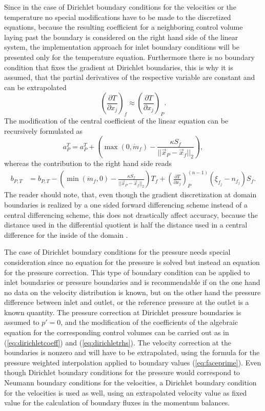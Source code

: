 Since in the case of Dirichlet boundary conditions for the velocities or the temperature no special modifications have to be made to the discretized equations, because the resulting coefficient for a neighboring control volume laying past the boundary is considered on the right hand side of the linear system, the implementation approach for inlet boundary conditions will be presented only for the temperature equation. Furthermore there is no boundary condition that fixes the gradient at Dirichlet boundaries, this is why it is assumed, that the partial derivatives of the respective variable are constant and can be extrapolated
\begin{displaymath}
  \left( \frac{\partial T}{\partial x_j} \right)_f \approx \left( \frac{\partial T}{\partial x_j} \right)_P.
\end{displaymath}
The modification of the central coefficient of the linear equation can be recursively formulated as
\begin{equation}
  \label{eq:dirichletcoeff}
  a_P^{T} = a_P^{T} + \left( \max(0,\dot{m}_f )  - \frac{\kappa S_f}{|| \vec{x}_P - \vec{x}_f ||_2} \right),
\end{equation}
whereas the contribution to the right hand side reads
\begin{align}
  \label{eq:dirichletrhs}
  b_{P,T} &= b_{P,T} - \left( \min(\dot{m}_f,0) - \frac{\kappa S_f}{||\vec{x}_P - \vec{x}_f||_2}\right) T_f +
  \left( \frac{\partial T}{\partial x_j}\right)_P^{(n-1)} \left(\xi_{f_j} - n_{f_j}\right)S_f.
\end{align}
The reader should note, that, even though the gradient discretization at domain boundaries is realized by a one sided forward differencing scheme instead of a central differencing scheme, this does not drastically affect accuracy, because the distance used in the differential quotient is half the distance used in a central difference for the inside of the domain \cite{schaefer99}.

The case of Dirichlet boundary conditions for the pressure needs special consideration since no equation for the pressure is solved but instead an equation for the pressure correction. This type of boundary condition can be applied to inlet boundaries or pressure boundaries and is recommendable if on the one hand no data on the velocity distribution is known, but on the other hand the pressure difference between inlet and outlet, or the reference pressure at the outlet is a known quantity. The pressure correction at Dirichlet pressure boundaries is assumed to \(p' = 0\), and the modification of the coefficients of the algebraic equation for the corresponding control volumes can be carried out as in (\ref{eq:dirichletcoeff}) and (\ref{eq:dirichletrhs}). The velocity correction at the boundaries is nonzero and will have to be extrapolated, using the formula for the pressure weighted interpolation applied to boundary values (\ref{eq:faceprime}). Even though Dirichlet boundary conditions for the pressure would correspond to Neumann boundary conditions for the velocities, a Dirichlet boundary condition for the velocities is used as well, using an extrapolated velocity value as fixed value for the calculation of boundary fluxes in the momentum balances. 


